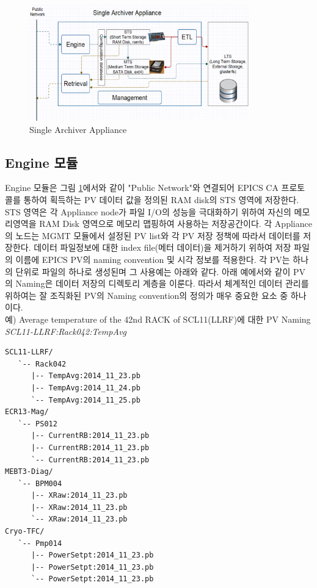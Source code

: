 \documentclass[11pt
  , a4paper
  , article
  , oneside
]{memoir}
\begin{document}
\begin{figure}[h!]
	\centering
	\includegraphics[width=0.85\textwidth]{./images/image-3.eps}
	\caption{Single Archiver Appliance}
	\label{fig:single_appliance} 
\end{figure}

\subsection*{Engine 모듈}
Engine 모듈은 그림 \ref{fig:single_appliance}에서와 같이 "Public Network"와 연결되어 EPICS CA 프로토콜를 통하여 획득하는 PV 데이터 값을 정의된 RAM disk의 STS 영역에 저장한다. STS 영역은 각 Appliance node가 파일 I/O의 성능을 극대화하기 위하여 자신의 메모리영역을 RAM Disk 영역으로 메모리 맵핑하여 사용하는 저장공간이다. 각 Appliance의 노드는 MGMT 모듈에서 설정된 PV list와 각 PV 저장 정책에 따라서 데이터를 저장한다. 데이터 파일정보에 대한 index file(메터 데이터)을 제거하기 위하여 저장 파일의 이름에 EPICS PV의 naming convention 및 시각 정보를 적용한다. 각 PV는 하나의 단위로 파일의 하나로 생성된며 그 사용예는 아래와 같다. 아래 예에서와 같이 PV의 Naming은 데이터 저장의 디렉토리 계층을 이룬다. 따라서 체계적인 데이터 관리를 위하여는 잘 조직화된 PV의 Naming convention의 정의가 매우 중요한 요소 중 하나이다.
\\
예) Average temperature of the 42nd RACK of SCL11(LLRF)에 대한 PV Naming \\ 
\textit{SCL11-LLRF:Rack042:TempAvg}
\begin{lstlisting}[style=termstyle]
SCL11-LLRF/
   `-- Rack042
      |-- TempAvg:2014_11_23.pb
      |-- TempAvg:2014_11_24.pb
      `-- TempAvg:2014_11_25.pb
ECR13-Mag/
   `-- PS012
      |-- CurrentRB:2014_11_23.pb
      |-- CurrentRB:2014_11_23.pb
      `-- CurrentRB:2014_11_23.pb
MEBT3-Diag/
   `-- BPM004
      |-- XRaw:2014_11_23.pb
      |-- XRaw:2014_11_23.pb
      `-- XRaw:2014_11_23.pb
Cryo-TFC/
   `-- Pmp014
      |-- PowerSetpt:2014_11_23.pb
      |-- PowerSetpt:2014_11_23.pb
      `-- PowerSetpt:2014_11_23.pb
\end{lstlisting}
\end{document}
